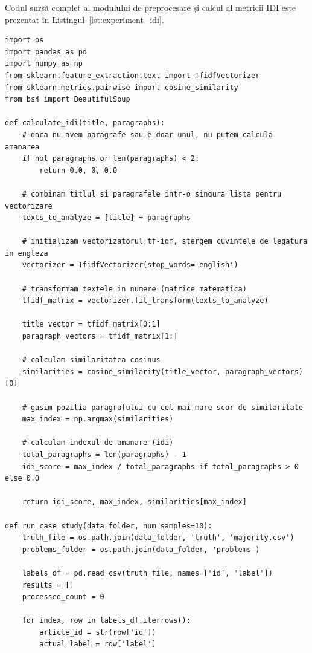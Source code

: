 \documentclass[12pt, a4paper]{article}
\begin{document}
Codul sursă complet al modulului de preprocesare și calcul al metricii IDI este prezentat în Listingul~\ref{lst:experiment_idi}.

\begin{lstlisting}[label={lst:experiment_idi}, caption={Scriptul de preprocesare HTML si calcul al scorului IDI (\texttt{experiment\_idi.py})}]
import os
import pandas as pd
import numpy as np
from sklearn.feature_extraction.text import TfidfVectorizer
from sklearn.metrics.pairwise import cosine_similarity
from bs4 import BeautifulSoup

def calculate_idi(title, paragraphs):
    # daca nu avem paragrafe sau e doar unul, nu putem calcula amanarea
    if not paragraphs or len(paragraphs) < 2:
        return 0.0, 0, 0.0
    
    # combinam titlul si paragrafele intr-o singura lista pentru vectorizare
    texts_to_analyze = [title] + paragraphs
    
    # initializam vectorizatorul tf-idf, stergem cuvintele de legatura in engleza
    vectorizer = TfidfVectorizer(stop_words='english')
    
    # transformam textele in numere (matrice matematica)
    tfidf_matrix = vectorizer.fit_transform(texts_to_analyze)
    
    title_vector = tfidf_matrix[0:1]
    paragraph_vectors = tfidf_matrix[1:]
    
    # calculam similaritatea cosinus
    similarities = cosine_similarity(title_vector, paragraph_vectors)[0]
    
    # gasim pozitia paragrafului cu cel mai mare scor de similaritate
    max_index = np.argmax(similarities)
    
    # calculam indexul de amanare (idi)
    total_paragraphs = len(paragraphs) - 1
    idi_score = max_index / total_paragraphs if total_paragraphs > 0 else 0.0
    
    return idi_score, max_index, similarities[max_index]

def run_case_study(data_folder, num_samples=10):
    truth_file = os.path.join(data_folder, 'truth', 'majority.csv')
    problems_folder = os.path.join(data_folder, 'problems')
    
    labels_df = pd.read_csv(truth_file, names=['id', 'label'])
    results = []
    processed_count = 0
    
    for index, row in labels_df.iterrows():
        article_id = str(row['id'])
        actual_label = row['label']
        

\end{lstlisting}
\end{document}
